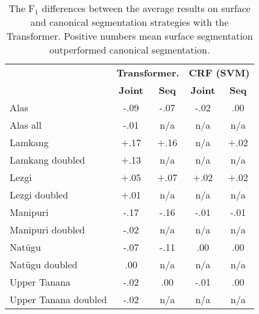 \begin{table}[!tb]
    \centering
    \begin{tabular}{l|c|c|c|c}
          & \multicolumn{2}{c|}{\textbf{Transformer.}} & \multicolumn{2}{c}{\textbf{CRF (SVM)}} \\
          & \textbf{Joint} & \textbf{Seq} & \textbf{Joint} & \textbf{Seq} \\
         \hline
         Alas  & -.09 &  -.07 & -.02 & .00 \\
         Alas all & -.01 & n/a & n/a & n/a \\
         \hline
         Lamkang  & $+$.17 & $+$.16 & n/a & $+$.02 \\
         Lamkang doubled & $+$.13 & n/a & n/a & n/a \\
         \hline
         Lezgi  & $+$.05 & $+$.07 & $+$.02 & $+$.02 \\
         Lezgi doubled & $+$.01 & n/a & n/a & n/a \\
         \hline
         Manipuri  & -.17 & -.16 & -.01 & -.01 \\
         Manipuri doubled & -.02 & n/a & n/a & n/a \\
         \hline
         Natügu  & -.07 & -.11 & .00 & .00 \\
         Natügu doubled & .00 & n/a & n/a & n/a \\
         \hline
         Upper Tanana & -.02 & .00 & -.01 & .00 \\
         Upper Tanana doubled & -.02 & n/a & n/a & n/a \\
    \end{tabular}
    \caption[F$_1$-score Differences between Surface and Canonical Segmentation]{The F$_1$ differences between the average results on surface and canonical segmentation strategies with the Transformer. Positive numbers mean surface segmentation outperformed canonical segmentation.}
    \label{tab:segdiffresults}
\end{table}


